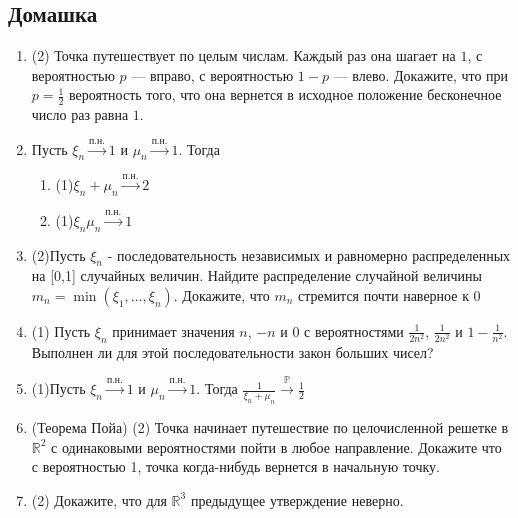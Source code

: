 \documentclass[a4paper, 14pt]{extarticle}
\begin{document}
\subsection*{Домашка}
\begin{enumerate}
\item (2) Точка путешествует по целым числам. Каждый раз она шагает на $1$, с вероятностью $p$ — вправо, с вероятностью $1-p$ — влево. 
Докажите, что при $p = \frac{1}{2}$ вероятность того, что она вернется в исходное положение бесконечное число раз равна $1$.


\item Пусть $\xi_n \overset{\textrm{п.н.}}{\to} 1$ и $\mu_n \overset{\textrm{п.н.}}{\to} 1$. 
Тогда 
\begin{enumerate}
\item (1)$\xi_n + \mu_n \overset{\textrm{п.н.}}{\to} 2$
\item (1)$\xi_n\mu_n \overset{\textrm{п.н.}}{\to} 1$
\end{enumerate}

\item (2)Пусть $\xi_n$ - последовательность независимых и равномерно распределенных на [0,1] случайных величин. 
Найдите распределение случайной величины $m_n=\min (\xi_1,\ldots,\xi_n)$. Докажите, что $m_n$ стремится почти наверное к 0

\item (1) Пусть $\xi_n$ принимает значения $n$, $-n$ и $0$ с вероятностями $\frac{1}{2n^2}$, $\frac{1}{2n^2}$ и $1 - \frac{1}{n^2}$.
Выполнен ли для этой последовательности закон больших чисел? 

\item (1)Пусть $\xi_n \overset{\textrm{п.н.}}{\to} 1$ и $\mu_n \overset{\textrm{п.н.}}{\to} 1$. 
Тогда $\frac{1}{\xi_n + \mu_n} \overset{\mathbb{P}}{\to} \frac{1}{2}$

\item (Теорема Пойа) 
(2) Точка начинает путешествие по целочисленной решетке в $\mathbb{R}^2$ с одинаковыми вероятностями пойти в любое направление.
Докажите что с вероятностью 1, точка когда-нибудь вернется в начальную точку.
\item (2) Докажите, что для $\mathbb{R}^3$ предыдущее утверждение неверно.


\end{enumerate}
\end{document}
